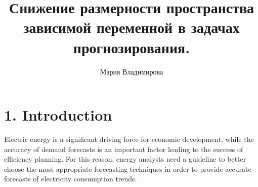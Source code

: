 \documentclass[12pt,twoside]{article}
\title
	{Снижение размерности пространства зависимой переменной в задачах прогнозирования.}
\author
	{Мария Владимирова}
\begin{document}
\maketitle










\section{1. Introduction}

	Electric energy is a significant driving force for economic development, while the accuracy of demand forecasts is an important factor leading to the success of efficiency planning. For this reason, energy analysts need a guideline to better choose the most appropriate forecasting techniques in order to provide accurate forecasts of electricity consumption trends. 
	
\end{document}
